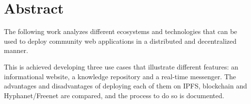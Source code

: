 \section{Abstract}

The following work analyzes different ecosystems and technologies that can be used to deploy community web applications in a distributed and decentralized manner.

This is achieved developing three use cases that illustrate different features: an informational website, a knowledge repository and a real-time messenger. The advantages and disadvantages of deploying each of them on IPFS, blockchain and Hyphanet/Freenet are compared, and the process to do so is documented.